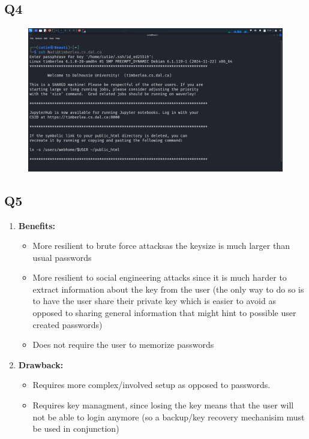 \documentclass{article}
\numberwithin{equation}{subsection}
\begin{document}
	\vspace{25pt}

	\subsection{Q4}
	\begin{figure}[H]
		\includegraphics[width=430pt]{pics/q1/3.png}
	\end{figure}

	
	\vspace{25pt}
	\subsection{Q5}
	\begin{enumerate}
		\item \textbf{Benefits:}
			\begin{itemize}
				\item More resilient to brute force attacksas the keysize is much larger than 
					usual passwords
				\item More resilient to social engineering attacks since it is much harder to
					extract information about the key from the user (the only way to do so is to have the user share
					their private key which is easier to avoid as opposed to sharing general information that might
					hint to possible user created passwords)
				\item Does not require the user to memorize passwords
			\end{itemize}		

			\item \textbf{Drawback:}
				\begin{itemize}
					\item Requires more complex/involved setup as opposed to passwords.
					\item Requires key managment, since losing the key means that the user
						will not be able to login anymore (so a backup/key recovery mechanisim must be used in conjunction)
				\end{itemize}
		
	\end{enumerate}
	\newpage
\end{document}
